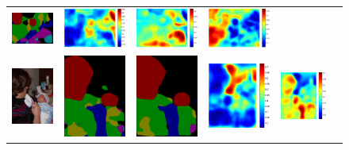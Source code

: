 \documentclass[10pt,twocolumn,letterpaper]{article}
\begin{document}
\begin{figure}
\begin{tabular}{c c c c c c}
   \includegraphics[height=0.09\linewidth]{fig/voc10_part/res_sharenet/2008_000492.png} &
   \includegraphics[height=0.09\linewidth]{fig/voc10_part/att1/2008_000492.pdf} &
   \includegraphics[height=0.09\linewidth]{fig/voc10_part/att2/2008_000492.pdf} &
   \includegraphics[height=0.09\linewidth]{fig/voc10_part/att3/2008_000492.pdf} \\
   \includegraphics[height=0.13\linewidth]{fig/voc10_part/img/2008_000691.jpg} &
   \includegraphics[height=0.13\linewidth]{fig/voc10_part/res_baseline/2008_000691.png} &
   \includegraphics[height=0.13\linewidth]{fig/voc10_part/res_sharenet/2008_000691.png} &
   \includegraphics[height=0.13\linewidth]{fig/voc10_part/att1/2008_000691.pdf} &
   \includegraphics[height=0.13\linewidth]{fig/voc10_part/att2/2008_000691.pdf} &

\end{tabular}
\end{figure}
\end{document}
